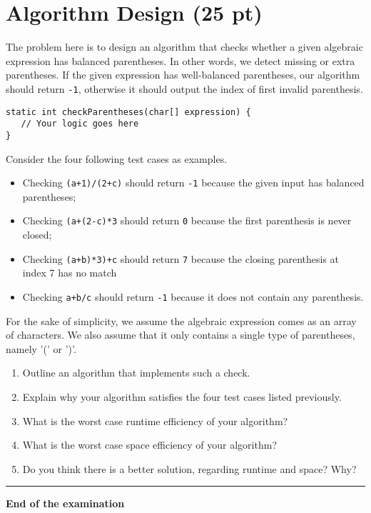 \documentclass[11pt]{article}
\begin{document}
\section{Algorithm Design (25 pt)}
\label{sec:org7c25fb9}

The problem here is to design an algorithm that checks whether a
given algebraic expression has balanced parentheses. In other words,
we detect missing or extra parentheses. If the given expression has
well-balanced parentheses, our algorithm should return \texttt{-1},
otherwise it should output the index of first invalid parenthesis.

\begin{verbatim}
static int checkParentheses(char[] expression) {
   // Your logic goes here
} 
\end{verbatim}

Consider the four following test cases as examples.
\begin{itemize}
\item Checking \texttt{(a+1)/(2+c)} should return \texttt{-1} because the given input
has balanced parentheses;
\item Checking \texttt{(a+(2-c)*3} should return \texttt{0} because the first
parenthesis is never closed;
\item Checking \texttt{(a+b)*3)+c} should return \texttt{7} because the closing parenthesis
at index 7 has no match
\item Checking \texttt{a+b/c} should return \texttt{-1} because it does not contain
any parenthesis.
\end{itemize}

For the sake of simplicity, we assume the algebraic expression comes
as an array of characters. We also assume that it only contains a
single type of parentheses, namely '(' or ')'.

\begin{enumerate}
\item Outline an algorithm that implements such a check.

\item Explain why your algorithm satisfies the four test cases listed
previously.

\item What is the worst case runtime efficiency of your algorithm?

\item What is the worst case space efficiency of your algorithm?

\item Do you think there is a better solution, regarding runtime and
space? Why?
\end{enumerate}

\noindent\rule{\textwidth}{0.5pt}
\textbf{End of the examination}
\end{document}
